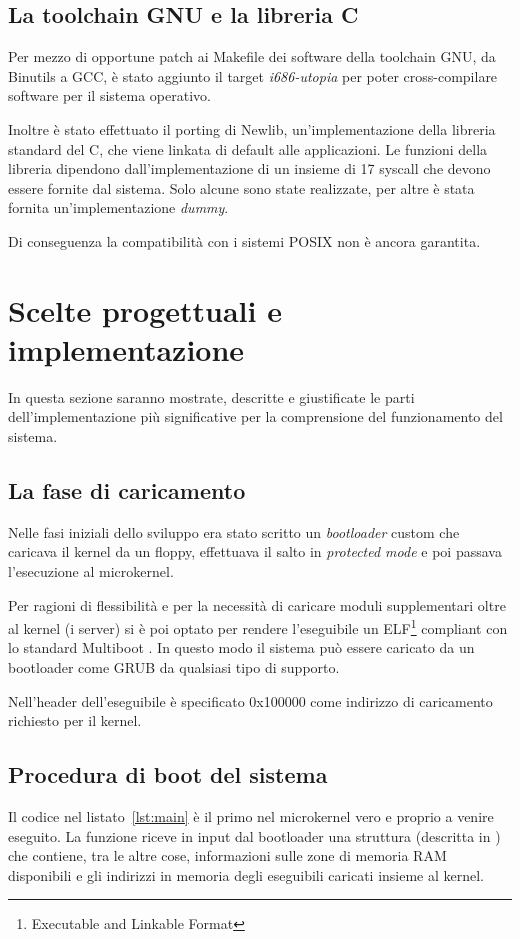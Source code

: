 \documentclass[12pt,a4paper]{report}
\begin{document}
		\subsection{La toolchain GNU e la libreria C}
			Per mezzo di opportune patch ai Makefile dei software della toolchain GNU, da Binutils a GCC,
			è stato aggiunto il target \emph{i686-utopia} per poter cross-compilare software per il sistema operativo.
			
			Inoltre è stato effettuato il porting di Newlib, un'implementazione della libreria standard del C,
			che viene linkata di default alle applicazioni. Le funzioni della libreria dipendono dall'implementazione
			di un insieme di 17 syscall che devono essere fornite dal sistema. Solo alcune sono state realizzate,
			per altre è stata fornita un'implementazione \emph{dummy}.
			
			Di conseguenza la compatibilità con i sistemi POSIX non è ancora garantita.
	
	\section{Scelte progettuali e implementazione} 
		In questa sezione saranno mostrate, descritte e giustificate le parti dell'implementazione
		più significative per la comprensione del funzionamento del sistema.
	
		\subsection{La fase di caricamento}
			Nelle fasi iniziali dello sviluppo era stato scritto un \emph{bootloader} custom che caricava il kernel
			da un floppy, effettuava il salto in \emph{protected mode} e poi passava l'esecuzione al microkernel.
			
			Per ragioni di flessibilità e per la necessità di caricare moduli supplementari oltre al kernel (i server)
			si è poi optato per rendere l'eseguibile un ELF\footnote{Executable and Linkable Format} compliant con lo standard Multiboot \cite{Multiboot}.
			In questo modo il sistema può essere caricato da un bootloader come GRUB da qualsiasi tipo di supporto.
			
			Nell'header dell'eseguibile è specificato 0x100000 come indirizzo di caricamento richiesto per il kernel.
			
		\subsection{Procedura di boot del sistema}			
			Il codice nel listato~\ref{lst:main} è il primo nel microkernel vero e proprio a venire eseguito.
			La funzione riceve in input dal bootloader una struttura (descritta in \cite{Multiboot}) che contiene,
			tra le altre cose, informazioni sulle zone di memoria RAM disponibili e gli indirizzi in memoria
			degli eseguibili caricati insieme al kernel.
			
\end{document}
